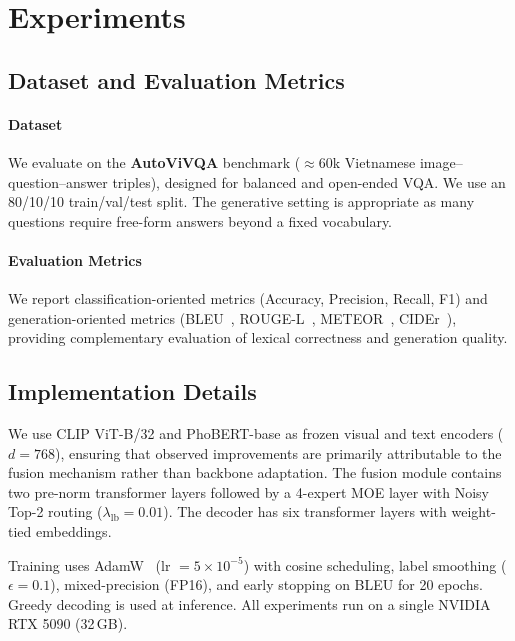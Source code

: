 
\section{Experiments}
\label{sec:experiments}

\subsection{Dataset and Evaluation Metrics}
\label{sec:experiments:dataset}

\paragraph{Dataset}
We evaluate on the \textbf{AutoViVQA} benchmark ($\approx$60k Vietnamese image--question--answer triples), designed for balanced and open-ended VQA. We use an 80/10/10 train/val/test split. The generative setting is appropriate as many questions require free-form answers beyond a fixed vocabulary.

\paragraph{Evaluation Metrics}
We report classification-oriented metrics (Accuracy, Precision, Recall, F1) and generation-oriented metrics (BLEU~\cite{papineni2002bleu}, ROUGE-L~\cite{lin2004rouge}, METEOR~\cite{banerjee2005meteor}, CIDEr~\cite{vedantam2015cider}), providing complementary evaluation of lexical correctness and generation quality.

\subsection{Implementation Details}
\label{sec:experiments:impl}

We use CLIP ViT-B/32 and PhoBERT-base as frozen visual and text encoders ($d{=}768$), ensuring that observed improvements are primarily attributable to the fusion mechanism rather than backbone adaptation. The fusion module contains two pre-norm transformer layers followed by a 4-expert MOE layer with Noisy Top-2 routing ($\lambda_\text{lb}{=}0.01$). The decoder has six transformer layers with weight-tied embeddings.

Training uses AdamW~\cite{loshchilov2019decoupled} (lr $= 5{\times}10^{-5}$) with cosine scheduling, label smoothing ($\epsilon{=}0.1$), mixed-precision (FP16), and early stopping on BLEU for 20 epochs. Greedy decoding is used at inference. All experiments run on a single NVIDIA RTX 5090 (32\,GB).

